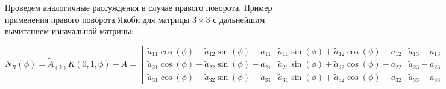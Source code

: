 Проведем аналогичные рассуждения в случае правого поворота.
Пример применения правого поворота Якоби для матрицы $3 \times 3$ с дальнейшим вычитанием изначальной матрицы:
\begin{center}
    $N_{R}(\phi) = \tilde{A}_{(k)}K(0,1,\phi) - A =\left[\begin{matrix}\tilde{a}_{11} \cos{\left(\phi \right)} - \tilde{a}_{12} \sin{\left(\phi \right)} - {a}_{11} & \tilde{a}_{11} \sin{\left(\phi \right)} + \tilde{a}_{12} \cos{\left(\phi \right)} - {a}_{12} & \tilde{a}_{13} - {a}_{13}\\\tilde{a}_{21} \cos{\left(\phi \right)} - \tilde{a}_{22} \sin{\left(\phi \right)} - {a}_{21} & \tilde{a}_{21} \sin{\left(\phi \right)} + \tilde{a}_{22} \cos{\left(\phi \right)} - {a}_{22} & \tilde{a}_{23} - {a}_{23}\\\tilde{a}_{31} \cos{\left(\phi \right)} - \tilde{a}_{32} \sin{\left(\phi \right)} - {a}_{31} & \tilde{a}_{31} \sin{\left(\phi \right)} + \tilde{a}_{32} \cos{\left(\phi \right)} - {a}_{32} & \tilde{a}_{33} - {a}_{33}\end{matrix}\right]$
\end{center}

